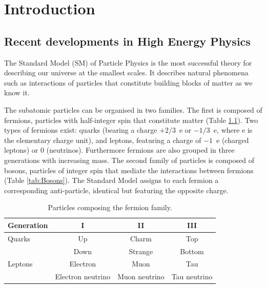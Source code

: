 \chapter[Introduction]{Introduction}

\section[Recent developments in High Energy Physics]{Recent developments in High Energy Physics}

The Standard Model (SM) of Particle Physics \cite{Standard-model} is the most successful theory for describing our universe at the smallest scales. It describes natural phenomena such as interactions of particles that constitute building blocks of matter as we know it.

The subatomic particles can be organised in two families. The first is composed of fermions, particles with half-integer spin that constitute matter (Table \ref{tab:Fermions}). Two types of fermions exist: quarks (bearing a charge $+2/3$~e or $-1/3$~e, where e is the elementary charge unit), and leptons, featuring a charge of $-1$~e (charged leptons) or $0$ (neutrinos). Furthermore fermions are also grouped in three generations with increasing mass. The second family of particles is composed of bosons, particles of integer spin that mediate the interactions between fermions (Table \ref{tab:Bosons}). The Standard Model assigns to each fermion a corresponding anti-particle, identical but featuring the opposite charge.

\begin{table}[!b]
  \centering
    \begin{tabular}{l c c c}
    \toprule
    Generation  & I & II  & III \\
    \midrule
    Quarks  & Up  & Charm & Top \\
              & Down& Strange & Bottom \\
    \hline
    Leptons		& Electron & Muon & Tau	\\
              & Electron neutrino & Muon neutrino & Tau neutrino	\\
    \bottomrule
    \end{tabular}
  \caption{Particles composing the fermion family.} \label{tab:Fermions}
\end{table}


